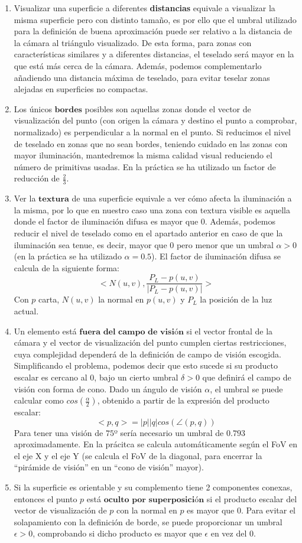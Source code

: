 	\begin{enumerate}
		\item Visualizar una superficie a diferentes \textbf{distancias} equivale a visualizar la misma superficie pero con distinto tamaño, es por ello que el umbral utilizado para la definición de buena aproximación puede ser relativo a la distancia de la cámara al triángulo visualizado. De esta forma, para zonas con características similares y a diferentes distancias, el teselado será mayor en la que está más cerca de la cámara. Además, podemos complementarlo añadiendo una distancia máxima de teselado, para evitar teselar zonas alejadas en superficies no compactas.
		\item Los únicos $\textbf{bordes}$ posibles son aquellas zonas donde el vector de visualización del punto (con origen la cámara y destino el punto a comprobar, normalizado) es perpendicular a la normal en el punto. Si reducimos el nivel de teselado en zonas que no sean bordes, teniendo cuidado en las zonas con mayor iluminación, mantedremos la misma calidad visual reduciendo el número de primitivas usadas. En la práctica se ha utilizado un factor de reducción de $\frac{2}{3}$.
		\item Ver la $\textbf{textura}$ de una superficie equivale a ver cómo afecta la iluminación a la misma, por lo que en nuestro caso una zona con textura visible es aquella donde el factor de iluminación difusa es mayor que $0$. Además, podemos reducir el nivel de teselado como en el apartado anterior en caso de que la iluminación sea tenue, es decir, mayor que $0$ pero menor que un umbral $\alpha>0$ (en la práctica se ha utilizado $\alpha = 0.5$). El factor de iluminación difusa se calcula de la siguiente forma:
		$$<N(u,v),\frac{P_L-p(u,v)}{|P_L-p(u,v)|}>$$
		Con $p$ carta, $N(u,v)$ la normal en $p(u,v)$ y $P_L$ la posición de la luz actual.
		\item Un elemento está $\textbf{fuera del campo de visión}$ si el vector frontal de la cámara y el vector de visualización del punto cumplen ciertas restricciones, cuya complejidad dependerá de la definición de campo de visión escogida. Simplificando el problema, podemos decir que esto sucede si su producto escalar es cercano al $0$, bajo un cierto umbral $\delta>0$ que definirá el campo de visión con forma de cono. Dado un ángulo de visión $\alpha$, el umbral se puede calcular como $cos(\frac{\alpha}{2})$, obtenido a partir de la expresión del producto escalar:
		$$<p,q>=|p||q|cos(\angle(p,q))$$
		Para tener una visión de $75$º sería necesario un umbral de $0.793$ aproximadamente. En la prácitca se calcula automáticamente según el FoV en el eje X y el eje Y (se calcula el FoV de la diagonal, para encerrar la ``pirámide de visión'' en un ``cono de visión'' mayor).
		\item Si la superficie es orientable y su complemento tiene 2 componentes conexas, entonces el punto $p$ está $\textbf{oculto por superposición}$ si el producto escalar del vector de visualización de $p$ con la normal en $p$ es mayor que $0$. Para evitar el solapamiento con la definición de borde, se puede proporcionar un umbral $\epsilon>0$, comprobando si dicho producto es mayor que $\epsilon$ en vez del $0$.
	\end{enumerate}
	

